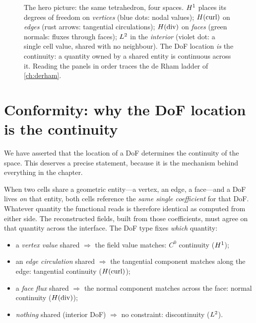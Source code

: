 \begin{figure}[t]
\caption[The four spaces and their DoF locations]{The hero picture: the same
tetrahedron, four spaces. $H^1$ places its degrees of freedom on \emph{vertices}
(blue dots: nodal values); $H(\mathrm{curl})$ on \emph{edges} (rust arrows: tangential
circulations); $H(\mathrm{div})$ on \emph{faces} (green normals: fluxes through faces); $L^2$
in the \emph{interior} (violet dot: a single cell value, shared with no neighbour). The
DoF location \emph{is} the continuity: a quantity owned by a shared entity is continuous
across it. Reading the panels in order traces the de Rham ladder of \cref{ch:derham}.}
\label{fig:fourspaces}
\end{figure}

\section{Conformity: why the DoF location is the continuity}

We have asserted that the location of a DoF determines the continuity of the space.
This deserves a precise statement, because it is the mechanism behind everything in
the chapter.

When two cells share a geometric entity---a vertex, an edge, a face---and a DoF lives
\emph{on} that entity, both cells reference the \emph{same single coefficient} for that
DoF. Whatever quantity the functional reads is therefore identical as computed from
either side. The reconstructed fields, built from those coefficients, must agree on
that quantity across the interface. The DoF type fixes \emph{which} quantity:

\begin{itemize}[nosep]
\item a \emph{vertex value} shared $\Rightarrow$ the field value matches: $C^0$
  continuity ($H^1$);
\item an \emph{edge circulation} shared $\Rightarrow$ the tangential component matches
  along the edge: tangential continuity ($H(\mathrm{curl})$);
\item a \emph{face flux} shared $\Rightarrow$ the normal component matches across the
  face: normal continuity ($H(\mathrm{div})$);
\item \emph{nothing} shared (interior DoF) $\Rightarrow$ no constraint: discontinuity
  ($L^2$).
\end{itemize}

